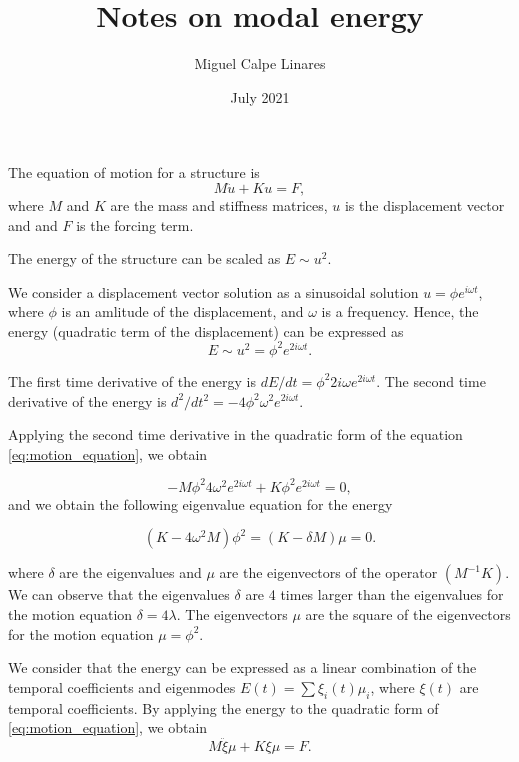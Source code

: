 \documentclass[12pt, letterpaper]{article}
\title{Notes on modal energy}
\author{Miguel Calpe Linares}
\date{July 2021}
\begin{document}
\maketitle
The equation of motion for a structure is 
\begin{equation}
    M \ddot{u} + K u = F,
\label{eq:motion_equation}
\end{equation}
where $M$ and $K$ are the mass and stiffness matrices, $u$ is the displacement vector and and $F$ is the forcing term.\newline

The energy of the structure can be scaled as $E \sim u^2$. \newline

We consider a displacement vector solution as a sinusoidal solution $u = \phi e^{i \omega t}$, where $\phi$ is an amlitude of the displacement, and $\omega$ is a frequency. Hence, the energy (quadratic term of the displacement) can be expressed as
\begin{equation}
    E \sim u^2 = \phi^2 e^{2 i \omega t}.
\end{equation}

The first time derivative of the energy is $dE/dt = \phi^2 2 i \omega e^{2 i \omega t} $. The second time derivative of the energy is $d^2/dt^2 = - 4 \phi^2 \omega^2 e^{2 i \omega t}$. \newline

Applying the second time derivative in the quadratic form of the equation \ref{eq:motion_equation}, we obtain

\begin{equation}
    -M \phi^2 4 \omega^2 e^{2 i \omega t} + K \phi^2 e^{2 i \omega t} = 0,
\end{equation}
and we obtain the following eigenvalue equation for the energy

\begin{equation}
    (K - 4 \omega^2 M) \phi^2 = (K- \delta M)\mu = 0.
\end{equation}

where $\delta$ are the eigenvalues and $\mu$ are the eigenvectors of the operator $(M^{-1}K)$. We can observe that the eigenvalues $\delta$ are 4 times larger than the eigenvalues for the motion equation $\delta = 4 \lambda$. The eigenvectors $\mu$ are the square of the eigenvectors for the motion equation $\mu =\phi^2$.\newline

We consider that the energy can be expressed as a linear combination of the temporal coefficients and eigenmodes $E(t) = \sum \xi_i(t) \mu_i$, where $\xi(t)$ are temporal coefficients. By applying the energy to the quadratic form of \ref{eq:motion_equation}, we obtain
\begin{equation}
    M \ddot{\xi} \mu + K \xi \mu = F.
\end{equation}
\end{document}
